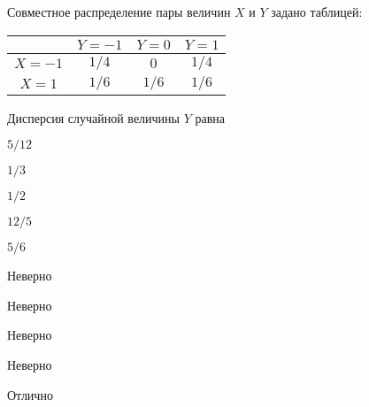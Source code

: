 
\begin{question}
Совместное распределение пары величин \(X\) и \(Y\) задано таблицей:

\begin{tabular}{@{}c|ccc@{}}
\toprule
       & $Y=-1$ & $Y=0$ & $Y=1$ \\ \midrule
$X=-1$ & $1/4$  & $0$   & $1/4$ \\
$X=1$  & $1/6$  & $1/6$ & $1/6$ \\ \bottomrule
\end{tabular}

\vspace{0.5cm}

Дисперсия случайной величины \(Y\) равна
\begin{answerlist}
  \item \(5/12\)
  \item \(1/3\)
  \item \(1/2\)
  \item \(12/5\)
  \item \(5/6\)
\end{answerlist}
\end{question}

\begin{solution}
\begin{answerlist}
  \item Неверно
  \item Неверно
  \item Неверно
  \item Неверно
  \item Отлично
\end{answerlist}
\end{solution}

